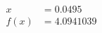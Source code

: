 \documentclass[preview]{standalone}
\begin{document}
\begin{align*}
x &= 0.0495\\f(x) &= 4.0941039
\end{align*}
\end{document}
